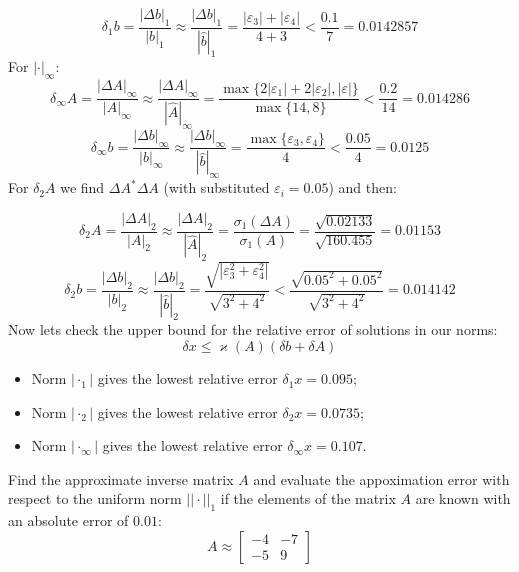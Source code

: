 \documentclass[12pt]{report}
\begin{document}
\begin{solution}
\[      \]
\[
   \delta_1 b =\dfrac{|\Delta b|_1}{|b|_1}\approx \dfrac{|\Delta b|_1}{|\hat{b}|_1} = \dfrac{|\varepsilon_3| + |\varepsilon_4|}{4 + 3} < \dfrac{0.1}{7}= 0.0142857 
\]
For $|\cdot|_\infty$:
\[
   \delta_{\infty} A =\dfrac{|\Delta A|_{\infty}}{|A|_{\infty}}\approx \dfrac{|\Delta A|_{\infty}}{|\hat{A}|_{\infty}} = \dfrac{\max\{2|\varepsilon_1| + 2|\varepsilon_2|, |\varepsilon|\}}{\max\{14, 8\}} < \dfrac{0.2}{14}= 0.014286
\]
\[
   \delta_{\infty} b =\dfrac{|\Delta b|_{\infty}}{|b|_{\infty}}\approx \dfrac{|\Delta b|_{\infty}}{|\hat{b}|_{\infty}} = \dfrac{\max\{\varepsilon_3, \varepsilon_4\}}{4} < \dfrac{0.05}{4}= 0.0125
\]
For $\delta_2 A$ we find $\Delta A^* \Delta A$ (with substituted $\varepsilon_i = 0.05$) and then:  

\[
   \delta_2 A =\dfrac{|\Delta A|_2}{|A|_2}\approx \dfrac{|\Delta A|_2}{|\hat{A}|_2} =\dfrac{\sigma_1 (\Delta A)}{\sigma_1 (A)} = \dfrac{\sqrt{0.02133}}{\sqrt{160.455}}= 0.01153
\]
\[
   \delta_2 b =\dfrac{|\Delta b|_2}{|b|_2}\approx \dfrac{|\Delta b|_2}{|\hat{b}|_2} = \dfrac{\sqrt{\left|\varepsilon_3^2 + \varepsilon_4^2\right|}}{\sqrt{3^2+4^2}} < \dfrac{\sqrt{0.05^2+0.05^2}}{\sqrt{3^2+4^2}}= 0.014142
\]
Now lets check the upper bound for the relative error of solutions in our norms:
\[
       \delta x \leq \varkappa (A) (\delta b + \delta A)
\]
\begin{itemize}
   \item Norm $|\cdot_1|$ gives the lowest relative error $\delta_1 x = 0.095$;
   \item Norm $|\cdot_2|$ gives the lowest relative error $\delta_2 x = 0.0735$;
   \item Norm $|\cdot_\infty|$ gives the lowest relative error $\delta_\infty x = 0.107$.
\end{itemize}
\end{solution}

\begin{problem}{}
   Find the approximate inverse matrix $A$ and evaluate the appoximation error with respect to the uniform norm $||\cdot||_1$ if the elements of the matrix $A$ are known with an absolute error of $0.01$:
   \[
       A \approx \begin{bmatrix}
         -4 & -7 \\
         -5 & 9
       \end{bmatrix}
   \] 
\end{problem}
\end{document}
